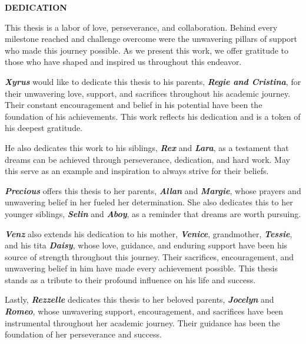 \begin{center}
	{\bf DEDICATION}\\[24pt]
\end{center}

{\baselineskip
	
This thesis is a labor of love, perseverance, and collaboration. Behind every milestone reached and challenge overcome were the unwavering pillars of support who made this journey possible. As we present this work, we offer gratitude to those who have shaped and inspired us throughout this endeavor.
	
\textbf{\textit{Xyrus}} would like to dedicate this thesis to his parents, \textbf{\textit{Regie and Cristina}}, for their unwavering love, support, and sacrifices throughout his academic journey. Their constant encouragement and belief in his potential have been the foundation of his achievements. This work reflects his dedication and is a token of his deepest gratitude.

He also dedicates this work to his siblings, \textbf{\textit{Rex}} and \textbf{\textit{Lara}}, as a testament that dreams can be achieved through perseverance, dedication, and hard work. May this serve as an example and inspiration to always strive for their beliefs.

\textbf{\textit{Precious}} offers this thesis to her parents, \textbf{\textit{Allan}} and \textbf{\textit{Margie}}, whose prayers and unwavering belief in her fueled her determination. She also dedicates this to her younger siblings, \textbf{\textit{Selin}} and \textbf{\textit{Aboy}}, as a reminder that dreams are worth pursuing.

\textbf{\textit{Venz}} also extends his dedication to his mother, \textbf{\textit{Venice}}, grandmother, \textbf{\textit{Tessie}}, and his tita \textbf{\textit{Daisy}}, whose love, guidance, and enduring support have been his source of strength throughout this journey. Their sacrifices, encouragement, and unwavering belief in him have made every achievement possible. This thesis stands as a tribute to their profound influence on his life and success.

Lastly, \textbf{\textit{Rezzelle}} dedicates this thesis to her beloved parents, \textbf{\textit{Jocelyn}} and \textbf{\textit{Romeo}}, whose unwavering support, encouragement, and sacrifices have been instrumental throughout her academic journey. Their guidance has been the foundation of her perseverance and success.

}
